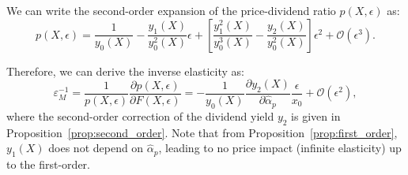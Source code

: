 We can write the second-order expansion of the price-dividend ratio $p(X,\epsilon)$ as:
\begin{equation}
p(X,\epsilon) = \frac{1}{y_0(X)} - \frac{y_1(X)}{y_0^2(X)} \epsilon + \left[ \frac{y_1^2(X)}{y_0^3(X)} - \frac{y_{2}(X)}{y_0^2(X)} \right] \epsilon^2 + \mathcal{O}(\epsilon^3).
\end{equation}

Therefore, we can derive the inverse elasticity as:
\begin{equation}\label{eq:elasticity-y2}
\varepsilon_M^{-1}=\frac{1}{p(X,\epsilon)}\frac{\partial p(X,\epsilon)}{\partial F(X,\epsilon)} = - \frac{1}{y_0(X)} \frac{\partial y_2(X)}{\partial \hat{\alpha}_p}\frac{\epsilon}{x_0} + \mathcal{O}(\epsilon^2),
\end{equation}
where the second-order correction of the dividend yield $ y_2 $ is given in Proposition~\ref{prop:second_order}. 
Note that from Proposition~\ref{prop:first_order}, $ y_1(X) $ does not depend on $ \hat{\alpha}_p $, leading to no price impact (infinite elasticity) up to the first-order.


